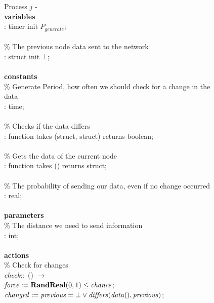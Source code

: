 \begin{figure}[H]
  \centering
  \begin{boxedminipage}{\linewidth}
    \null Process $j$ - \\
    \null \textbf{variables}\\
    \null\qq {}: timer init $P_{generate}$;\\~\\
    \null\qq \% The previous node data sent to the network\\
    \null\qq {}: struct init $\bot$;\\~\\
    \null \textbf{constants}\\
    \null\qq \% Generate Period, how often we should check for a change in the data\\
    \null\qq {}: time;\\~\\
    \null\qq \% Checks if the data differs\\
    \null\qq {}: function takes (struct, struct) returns boolean;\\~\\
    \null\qq \% Gets the data of the current node\\
    \null\qq {}: function takes () returns struct;\\~\\
    \null\qq \% The probability of sending our data, even if no change occurred\\
    \null\qq {}: real;\\~\\
    \null \textbf{parameters}\\
    \null\qq \% The distance we need to send information\\
    \null\qq {}: int;\\~\\
    \null \textbf{actions}\\
    \null\qq \% Check for changes\\
    \null\qq \emph{check}::~() $\rightarrow$\\
    \null\qq\qq $\mbox{\emph{force}} \mathrel{:=} \mbox{\textbf{RandReal}}(0, 1) \leq \mbox{\emph{chance}}$;\\
    \null\qq\qq $\mbox{\emph{changed}} \mathrel{:=} \mbox{\emph{previous}} = \bot \lor \mbox{\emph{differs}}(\mbox{\emph{data}}(), \mbox{\emph{previous}})$;\\

\end{boxedminipage}
\end{figure}
